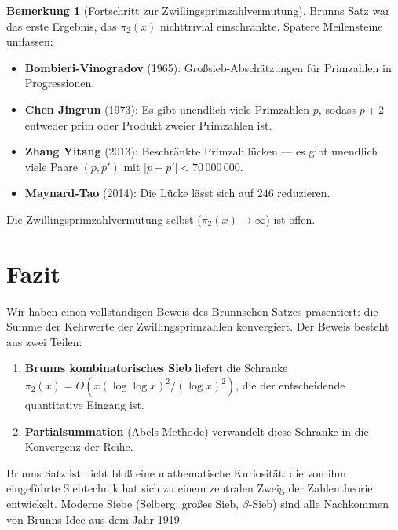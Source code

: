 \documentclass[12pt,a4paper]{amsart}
\theoremstyle{definition}
\newtheorem{bemerkung}[theorem]{Bemerkung}
\begin{document}
\begin{bemerkung}[Fortschritt zur Zwillingsprimzahlvermutung]
  Brunns Satz war das erste Ergebnis, das $\pi_2(x)$ nichttrivial einschränkte.
  Spätere Meilensteine umfassen:
  \begin{itemize}
    \item \textbf{Bombieri-Vinogradov} (1965): Großsieb-Abschätzungen für
      Primzahlen in Progressionen.
    \item \textbf{Chen Jingrun} (1973): Es gibt unendlich viele Primzahlen
      $p$, sodass $p+2$ entweder prim oder Produkt zweier Primzahlen ist.
    \item \textbf{Zhang Yitang} (2013): Beschränkte Primzahllücken --- es
      gibt unendlich viele Paare $(p, p')$ mit $|p - p'| < 70\,000\,000$.
    \item \textbf{Maynard-Tao} (2014): Die Lücke lässt sich auf $246$
      reduzieren.
  \end{itemize}
  Die Zwillingsprimzahlvermutung selbst ($\pi_2(x) \to \infty$) ist offen.
\end{bemerkung}

\section{Fazit}

Wir haben einen vollständigen Beweis des Brunnschen Satzes präsentiert:
die Summe der Kehrwerte der Zwillingsprimzahlen konvergiert.  Der Beweis
besteht aus zwei Teilen:
\begin{enumerate}
  \item \textbf{Brunns kombinatorisches Sieb} liefert die Schranke
    $\pi_2(x) = O(x(\log\log x)^2/(\log x)^2)$, die der entscheidende
    quantitative Eingang ist.
  \item \textbf{Partialsummation} (Abels Methode) verwandelt diese
    Schranke in die Konvergenz der Reihe.
\end{enumerate}

Brunns Satz ist nicht bloß eine mathematische Kuriosität: die von ihm
eingeführte Siebtechnik hat sich zu einem zentralen Zweig der Zahlentheorie
entwickelt.  Moderne Siebe (Selberg, großes Sieb, $\beta$-Sieb) sind alle
Nachkommen von Brunns Idee aus dem Jahr 1919.
\end{document}

